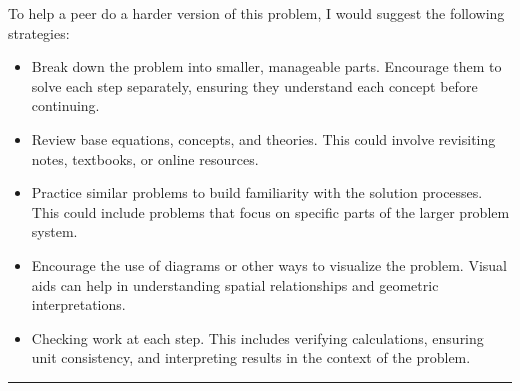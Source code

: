 \documentclass[12pt]{article} %
\numberwithin{equation}{section}
\begin{document}
\begin{enumerate}[label=\roman*.]
\pagebreak[3]
            \indent To help a peer do a harder version of this problem, I would suggest the following strategies:
            \begin{itemize}
                \item Break down the problem into smaller, manageable parts.
                    Encourage them to solve each step separately, ensuring they understand each concept before continuing.
                \item Review base equations, concepts, and theories.
                    This could involve revisiting notes, textbooks, or online resources.
                \item Practice similar problems to build familiarity with the solution processes.
                    This could include problems that focus on specific parts of the larger problem system.
                \item Encourage the use of diagrams or other ways to visualize the problem.
                    Visual aids can help in understanding spatial relationships and geometric interpretations.
                \item Checking work at each step.
                    This includes verifying calculations, ensuring unit consistency, and interpreting results in the context of the problem.
            \end{itemize}
            \begin{center}
            \rule{\linewidth}{1pt}
            \end{center}
\pagebreak[3]
    \end{enumerate}
\end{document}
